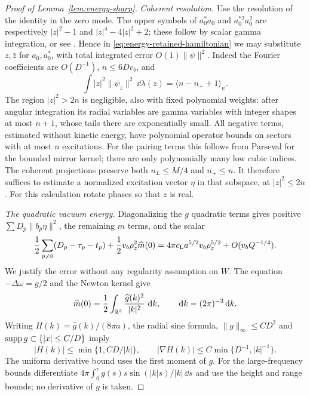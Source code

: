 \begin{proof}[Proof of Lemma~\ref{lem:energy-sharp}]
\emph{Coherent resolution.}
Use the resolution of the identity in the zero mode.  The upper symbols
of $a_0^*a_0$ and $a_0^{*2}a_0^2$ are respectively
$|z|^2-1$ and $|z|^4-4|z|^2+2$; these follow by scalar gamma integration,
or see \cite{LSY2005}.  Hence in
\eqref{eq:energy-retained-hamiltonian} we may substitute $z,\bar z$
for $a_0,a_0^*$, with total integrated error $O(1)\|\psi\|^2$.
Indeed the Fourier coefficients are $O(D^{-1})$, $n\le6Dv_b$, and
\[
 \int|z|^2\|\psi_z\|^2\,\dd\lambda(z)
       =\langle n-n_++1\rangle_\psi.
\]
The region $|z|^2>2n$ is negligible, also with fixed polynomial weights:
after angular integration its radial variables are gamma variables
with integer shapes at most $n+1$, whose tails there are exponentially
small.  All negative terms, estimated without kinetic energy, have
polynomial operator bounds on sectors with at most $n$ excitations.
For the pairing terms this follows from Parseval for the bounded mirror
kernel; there are only polynomially many low cubic indices.
The coherent projections preserve both $n_L\le M/4$ and $n_+\le n$.
It therefore suffices to estimate a normalized excitation vector $\eta$
in that subspace, at $|z|^2\le2n$.  For this calculation rotate phases
so that $z$ is real.

\emph{The quadratic vacuum energy.}
Diagonalizing the $g$ quadratic terms gives positive
$\sum D_p\|b_p\eta\|^2$, the remaining $m$ terms, and the scalar
\begin{equation}\label{eq:energy-lhy-scalar}
 \frac12\sum_{p\ne0}(D_p-\tau_p-t_p)
       +\frac12v_b\rho_z^2\widehat m(0)
 =4\pi c_{\rm L}a^{5/2}v_b\rho_z^{5/2}+O(v_bQ^{-1/4}).
\end{equation}
We justify the error without any regularity assumption on $W$.
The equation $-\Delta\omega=g/2$ and the Newton kernel give
\[
 \widehat m(0)=\frac12\int_{\mathbb R^3}\frac{\widehat g(k)^2}{|k|^2}
                      \,\,\mathrm d\bar k,\qquad
                   \,\mathrm d\bar k=(2\pi)^{-3}\,\mathrm d k.
\]
Writing $H(k)=\widehat g(k)/(8\pi a)$, the radial sine formula,
$\|g\|_\infty\le CD^2$ and $\operatorname{supp} g\subset\{|x|\le C/D\}$ imply
\begin{equation}\label{eq:energy-fourier-decay}
 |H(k)|\le\min\{1,CD/|k|\},\qquad
 |\nabla H(k)|\le C\min\{D^{-1},|k|^{-1}\}.
\end{equation}
The uniform derivative bound uses the first moment of $g$.
For the large-frequency bounds differentiate
$4\pi\int_0^r g(s)s\sin(|k|s)/|k|\,\dd s$ and use the height and range
bounds; no derivative of $g$ is taken.


\end{proof}

